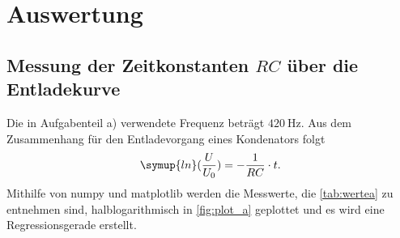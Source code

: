 \section{Auswertung}
\label{sec:Auswertung}


\subsection{Messung der Zeitkonstanten $RC$ über die Entladekurve}
Die in Aufgabenteil a) verwendete Frequenz beträgt $\SI{420}{\hertz}$. Aus dem Zusammenhang für den Entladevorgang eines Kondenators folgt
\begin{align}
    \symup{ln}(\frac{U}{U_{0}}) = -\frac{1}{RC}\cdot t.
\end{align}
Mithilfe von numpy \cite{numpy} und matplotlib \cite{matplotlib} werden die Messwerte, die
\autoref{tab:wertea} zu entnehmen sind, halblogarithmisch in \autoref{fig:plot_a} geplottet und es wird eine Regressionsgerade erstellt.

